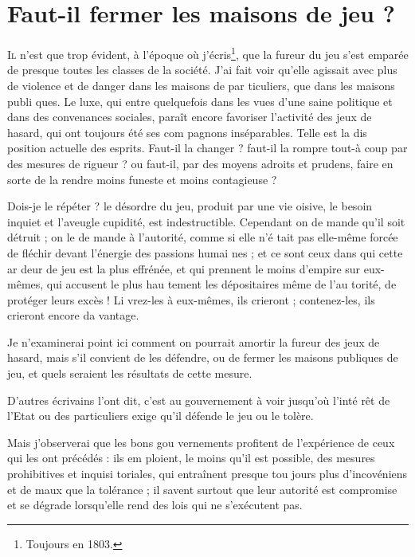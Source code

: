 \chapter{Faut-il fermer les maisons de jeu ?}


\lettrine{I}{l} n'est que trop évident, à l'époque
où j'écris\footnote{Toujours en 1803.}, que la fureur du jeu
s'est emparée de presque toutes les
classes de la société. J'ai fait voir
qu'elle agissait avec plus de violence
et de danger dans les maisons de par%
ticuliers, que dans les maisons publi%
ques. Le luxe, qui entre quelquefois
dans les vues d'une saine politique et
dans des convenances sociales, paraît
encore favoriser l'activité des jeux de
hasard, qui ont toujours été ses com%
pagnons inséparables. Telle est la dis%
position actuelle des esprits. Faut-il
la changer ? faut-il la rompre tout-à
coup par des mesures de rigueur ? ou
faut-il, par des moyens adroits et
prudens, faire en sorte de la rendre
moins funeste et moins contagieuse ?

Dois-je le répéter ? le désordre du
jeu, produit par une vie oisive, le
besoin inquiet et l'aveugle cupidité,
est indestructible. Cependant on de%
mande qu'il soit détruit ; on le de%
mande à l'autorité, comme si elle n'é%
tait pas elle-même forcée de fléchir
devant l'énergie des passions humai%
nes ; et ce sont ceux dans qui cette ar%
deur de jeu est la plus effrénée, et
qui prennent le moins d'empire sur
eux-mêmes, qui accusent le plus hau%
tement les dépositaires même de l'au%
torité, de protéger leurs excès ! Li%
vrez-les à eux-mêmes, ils crieront ;
contenez-les, ils crieront encore da%
vantage.

Je n'examinerai point ici comment
on pourrait amortir la fureur des
jeux de hasard, mais s'il convient de
les défendre, ou de fermer les maisons
publiques de jeu, et quels seraient les
résultats de cette mesure.

D'autres écrivains l'ont dit, c'est au
gouvernement à voir jusqu'où l'inté%
rêt de l'Etat ou des particuliers exige
qu'il défende le jeu ou le tolère.

Mais j'observerai que les bons gou%
vernements profitent de l'expérience
de ceux qui les ont précédés : ils em%
ploient, le moins qu'il est possible,
des mesures prohibitives et inquisi%
toriales, qui entraînent presque tou%
jours plus d'incovéniens et de maux
que la tolérance ; il savent surtout
que leur autorité est compromise et se
dégrade lorsqu'elle rend des lois qui 
ne s'exécutent pas.

